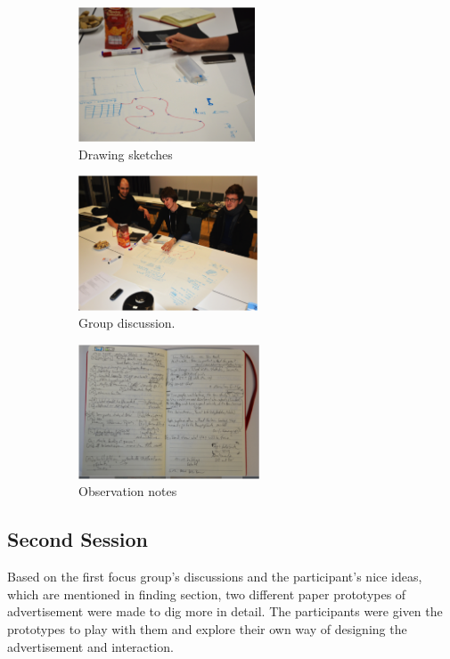 \begin{figure}[H]
    \centering
    \begin{subfigure}[H]{0.3\textwidth}
        \centering
        \includegraphics[width=\textwidth,height=4cm]{Figures/4/drawings}
        \caption{Drawing sketches}
        \label{fig:focus_group}
    \end{subfigure}
    \hfill
    \begin{subfigure}[H]{0.3\textwidth}
        \centering
        \includegraphics[width=\textwidth,height=4cm]{Figures/4/discussions}
        \caption{Group discussion.}
        \label{fig:meeting_room}
    \end{subfigure}
    \hfill
    \begin{subfigure}[H]{0.3\textwidth}
        \centering
        \includegraphics[width=\textwidth,height=4cm]{Figures/4/notes}
        \caption{Observation notes}
        \label{fig:meeting_room}
    \end{subfigure}
    \caption{}
    \label{fig:observation_env_observation_note}
\end{figure}


\subsection{Second Session}
Based on the first focus group's discussions and the participant's nice ideas, which are mentioned in finding section, two different paper prototypes of advertisement were made to dig more in detail. The participants were given the prototypes to play with them and explore their own way of designing the advertisement and interaction.

